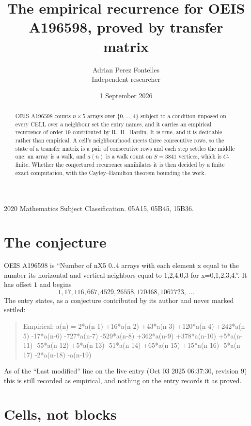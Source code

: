 \documentclass[11pt,a4paper]{article}
\title{The empirical recurrence for OEIS A196598, proved by transfer matrix}
\author{Adrian Perez Fontelles\\ \small Independent researcher}
\date{1 September 2026}
\theoremstyle{plain}
\theoremstyle{definition}
\begin{document}
\maketitle

\begin{abstract}
OEIS A196598 counts $n\times5$ arrays over $\{0,\dots,4\}$ subject to a condition imposed on
every CELL over a neighbour set the entry names, and it carries an empirical recurrence of
order $19$ contributed by R.~H.~Hardin. It is true, and it is decidable rather than
empirical. A cell's neighbourhood meets three consecutive rows, so the state of a transfer
matrix is a pair of consecutive rows and each step settles the middle one; an array is a
walk, and $a(n)$ is a walk count on $S=3841$ vertices, which is $C$-finite. Whether the
conjectured recurrence annihilates it is then decided by a finite exact computation, with the
Cayley--Hamilton theorem bounding the work.
\end{abstract}

\noindent\small 2020 Mathematics Subject Classification. 05A15, 05B45, 15B36.\normalsize

\section{The conjecture}

OEIS A196598 is ``Number of nX5 0..4 arrays with each element x equal to the number its horizontal and vertical neighbors equal to 1,2,4,0,3 for x=0,1,2,3,4.''. It has offset $1$ and begins
\[
1, 17, 116, 667, 4529, 26558, 170468, 1067723,\ \dots
\]
The entry states, as a conjecture contributed by its author and never marked settled:
\begin{quote}
Empirical: a(n) = 2*a(n-1) +16*a(n-2) +43*a(n-3) +120*a(n-4) +242*a(n-5) -17*a(n-6) -727*a(n-7) -529*a(n-8) +362*a(n-9) +378*a(n-10) +5*a(n-11) -55*a(n-12) +5*a(n-13) -51*a(n-14) +65*a(n-15) +15*a(n-16) -5*a(n-17) -2*a(n-18) -a(n-19)
\end{quote}
As of the ``Last modified'' line on the live entry (Oct 03 2025 06:37:30, revision 9) this is still
recorded as empirical, and nothing on the entry records it as proved.

\section{Cells, not blocks}
\end{document}
